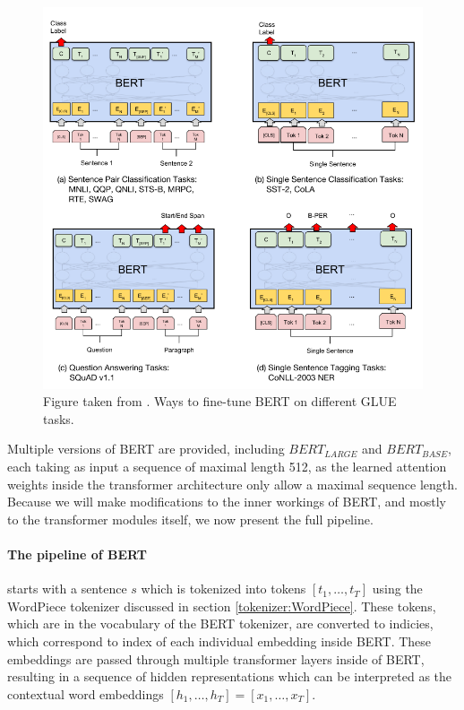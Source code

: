 \documentclass[a4paper,12pt,oneside,openright]{report}
\begin{document}
\begin{figure}[h]
	\center
  \includegraphics[width=0.8\linewidth]{./assets/background/BERT_GLUE_finetune.png}
  \caption{Figure taken from \cite{devlin18}. Ways to fine-tune BERT on different GLUE tasks.}
  \label{fig:cbow_skipgram}
\end{figure}

Multiple versions of BERT are provided, including $BERT_{LARGE}$ and $BERT_{BASE}$, each taking as input a sequence of maximal length 512, as the learned attention weights inside the transformer architecture only allow a maximal sequence length. 
Because we will make modifications to the inner workings of BERT, and mostly to the transformer modules itself, we now present the full pipeline. 

\paragraph{The pipeline of BERT} starts with a sentence $s$ which is tokenized into tokens $[t_1, \ldots, t_T]$ using the WordPiece tokenizer discussed in section \ref{tokenizer:WordPiece}.
These tokens, which are in the vocabulary of the BERT tokenizer, are converted to indicies, which correspond to index of each individual embedding inside BERT.
These embeddings are passed through multiple transformer layers inside of BERT, resulting in a sequence of hidden representations which can be interpreted as the contextual word embeddings $[h_1, \ldots, h_T] = [x_1, \ldots, x_T]$.
\end{document}
